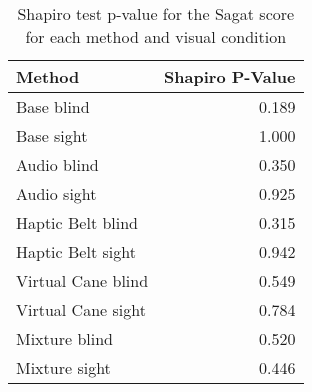 
\begin{table}[!htb]
\centering
\caption{Shapiro test p-value for the Sagat score for each method and visual condition}
\label{tab:shapiro_sagat_score}
\begin{tabular}{lr}
\toprule
            Method &  Shapiro P-Value \\
\midrule
        Base blind &            0.189 \\
        Base sight &            1.000 \\
       Audio blind &            0.350 \\
       Audio sight &            0.925 \\
 Haptic Belt blind &            0.315 \\
 Haptic Belt sight &            0.942 \\
Virtual Cane blind &            0.549 \\
Virtual Cane sight &            0.784 \\
     Mixture blind &            0.520 \\
     Mixture sight &            0.446 \\
\bottomrule
\end{tabular}
\end{table}

